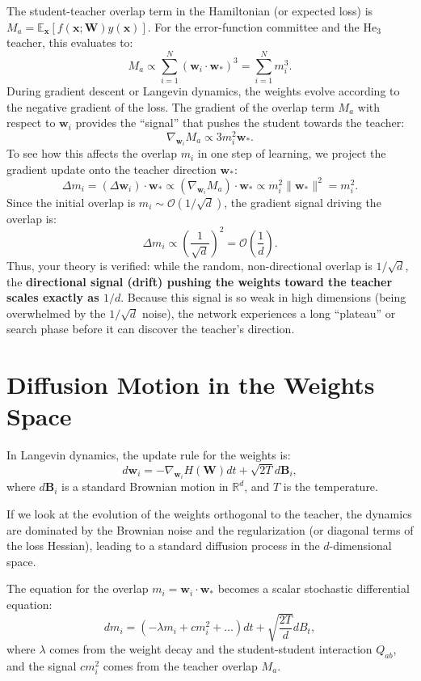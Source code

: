 \documentclass{article}
\begin{document}
The student-teacher overlap term in the Hamiltonian (or expected loss) is $M_a = \mathbb{E}_{\boldsymbol{x}}[f(\boldsymbol{x}; \boldsymbol{W}) y(\boldsymbol{x})]$. For the error-function committee and the $\text{He}_3$ teacher, this evaluates to:
\[
M_a \propto \sum_{i=1}^N \left( \boldsymbol{w}_i \cdot \boldsymbol{w}_* \right)^3 = \sum_{i=1}^N m_i^3.
\]
During gradient descent or Langevin dynamics, the weights evolve according to the negative gradient of the loss. The gradient of the overlap term $M_a$ with respect to $\boldsymbol{w}_i$ provides the ``signal'' that pushes the student towards the teacher:
\[
\nabla_{\boldsymbol{w}_i} M_a \propto 3 m_i^2 \boldsymbol{w}_*.
\]
To see how this affects the overlap $m_i$ in one step of learning, we project the gradient update onto the teacher direction $\boldsymbol{w}_*$:
\[
\Delta m_i = (\Delta \boldsymbol{w}_i) \cdot \boldsymbol{w}_* \propto (\nabla_{\boldsymbol{w}_i} M_a) \cdot \boldsymbol{w}_* \propto m_i^2 \|\boldsymbol{w}_*\|^2 = m_i^2.
\]
Since the initial overlap is $m_i \sim \mathcal{O}(1/\sqrt{d})$, the gradient signal driving the overlap is:
\[
\Delta m_i \propto \left( \frac{1}{\sqrt{d}} \right)^2 = \mathcal{O}\left(\frac{1}{d}\right).
\]
Thus, your theory is verified: while the random, non-directional overlap is $1/\sqrt{d}$, the \textbf{directional signal (drift) pushing the weights toward the teacher scales exactly as $1/d$}. Because this signal is so weak in high dimensions (being overwhelmed by the $1/\sqrt{d}$ noise), the network experiences a long ``plateau'' or search phase before it can discover the teacher's direction.

\section{Diffusion Motion in the Weights Space}
In Langevin dynamics, the update rule for the weights is:
\[
d\boldsymbol{w}_i = -\nabla_{\boldsymbol{w}_i} H(\boldsymbol{W}) dt + \sqrt{2T} d\boldsymbol{B}_i,
\]
where $d\boldsymbol{B}_i$ is a standard Brownian motion in $\mathbb{R}^d$, and $T$ is the temperature.

If we look at the evolution of the weights orthogonal to the teacher, the dynamics are dominated by the Brownian noise and the regularization (or diagonal terms of the loss Hessian), leading to a standard diffusion process in the $d$-dimensional space. 

The equation for the overlap $m_i = \boldsymbol{w}_i \cdot \boldsymbol{w}_*$ becomes a scalar stochastic differential equation:
\[
dm_i = \left( - \lambda m_i + c m_i^2 + \dots \right) dt + \sqrt{\frac{2T}{d}} dB_t,
\]
where $\lambda$ comes from the weight decay and the student-student interaction $Q_{ab}$, and the signal $c m_i^2$ comes from the teacher overlap $M_a$.
\end{document}
